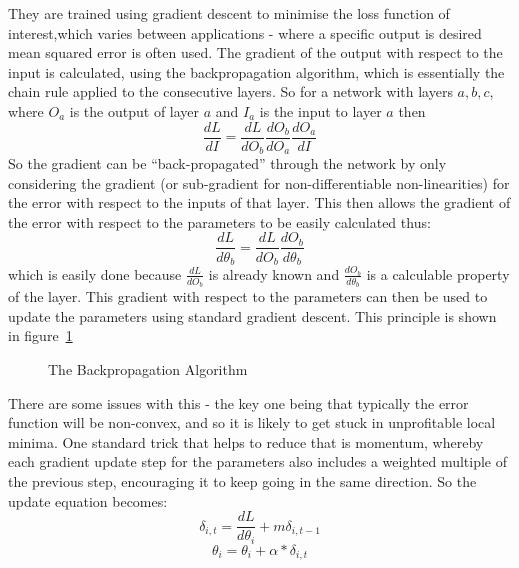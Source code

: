 They are trained using gradient descent to minimise the loss function of interest,which varies between applications - where a specific output is desired mean squared error is often used. The gradient of the output with respect to the input is calculated, using the backpropagation algorithm, which is essentially the chain rule applied to the consecutive layers. So for a network with layers $a, b, c$, where $O_a$ is the output of layer $a$ and $I_a$ is the input to layer $a$ then 
\begin{equation}
\frac{dL}{dI}  = \frac{dL}{dO_b} \frac{dO_b}{dO_a} \frac{dO_a}{dI} 
\end{equation} 
So the gradient can be ``back-propagated'' through the network by only considering the gradient (or sub-gradient for non-differentiable non-linearities) for the error with respect to the inputs of that layer. This then allows the gradient of the error with respect to the parameters to be easily calculated thus:
\begin{equation}
\frac{dL}{d\theta_b} = \frac{dL}{dO_b}\frac{dO_b}{d\theta_b} 
\end{equation}
which is easily done because $\frac{dL}{dO_b}$ is already known and $\frac{dO_b}{d\theta_b}$ is a calculable property of the layer. This gradient with respect to the parameters can then be used to update the parameters using standard gradient descent. This principle is shown in figure~\ref{fig:backprop}

\begin{figure}
\centering

\caption{The Backpropagation Algorithm}
\label{fig:backprop}
\end{figure}

There are some issues with this - the key one being  that typically the error function will be non-convex, and so it is likely to get stuck in unprofitable local minima. One standard trick that helps to reduce that is momentum, whereby each gradient update step for the parameters also includes a weighted multiple of the previous step, encouraging it to keep going in the same direction. So the update equation becomes:
\begin{equation*}
\delta_{i,t} = \frac{dL}{d\theta_i} + m\delta_{i,t-1}
\end{equation*}
\begin{equation}
\theta_i = \theta_i  + \alpha * \delta_{i,t}
\end{equation}

